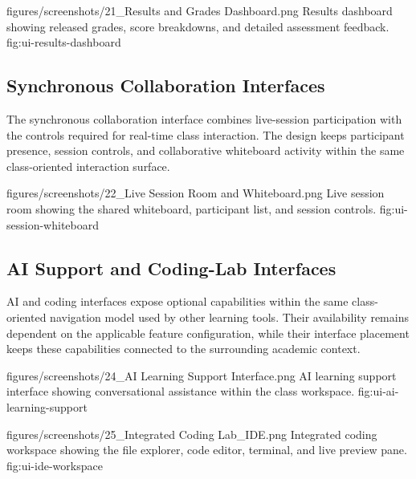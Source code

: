 \EduUiFigure
  {figures/screenshots/21_Results and Grades Dashboard.png}
  {Results dashboard showing released grades, score breakdowns, and detailed assessment feedback.}
  {fig:ui-results-dashboard}

\clearpage

\subsection{Synchronous Collaboration Interfaces}

The synchronous collaboration interface combines live-session participation
with the controls required for real-time class interaction. The design keeps
participant presence, session controls, and collaborative whiteboard activity
within the same class-oriented interaction surface.

\EduUiFigure
  {figures/screenshots/22_Live Session Room and Whiteboard.png}
  {Live session room showing the shared whiteboard, participant list, and session controls.}
  {fig:ui-session-whiteboard}

\clearpage

\subsection{AI Support and Coding-Lab Interfaces}

AI and coding interfaces expose optional capabilities within the same
class-oriented navigation model used by other learning tools. Their
availability remains dependent on the applicable feature configuration, while
their interface placement keeps these capabilities connected to the
surrounding academic context.

\EduUiFigure
  {figures/screenshots/24_AI Learning Support Interface.png}
  {AI learning support interface showing conversational assistance within the class workspace.}
  {fig:ui-ai-learning-support}

\EduUiFigure
  {figures/screenshots/25_Integrated Coding Lab_IDE.png}
  {Integrated coding workspace showing the file explorer, code editor, terminal, and live preview pane.}
  {fig:ui-ide-workspace}

\clearpage
